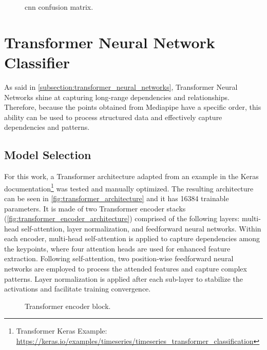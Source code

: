 \begin{figure}[ht]
    \centering
    {\fontsize{10}{12}\selectfont}
    \caption{\acs{cnn} confusion matrix.}
    \label{fig:cnn_dataset2_confusion_matrix}
\end{figure}

\section{Transformer Neural Network Classifier}
\label{section:transformer_classifier}

As said in \autoref{subsection:transformer_neural_networks}, Transformer Neural Networks shine at capturing long-range dependencies and relationships. Therefore, because the points obtained from Mediapipe have a specific order, this ability can be used to process structured data and effectively capture dependencies and patterns.

\subsection{Model Selection}

For this work, a Transformer architecture adapted from an example in the Keras documentation\footnote{Transformer Keras Example: \url{https://keras.io/examples/timeseries/timeseries_transformer_classification}} was tested and manually optimized. The resulting architecture can be seen in \autoref{fig:transformer_architecture} and it has \num{16384} trainable parameters. It is made of two Transformer encoder stacks (\autoref{fig:transformer_encoder_architecture}) comprised of the following layers: multi-head self-attention, layer normalization, and feedforward neural networks. Within each encoder, multi-head self-attention is applied to capture dependencies among the keypoints, where four attention heads are used for enhanced feature extraction. Following self-attention, two position-wise feedforward neural networks are employed to process the attended features and capture complex patterns. Layer normalization is applied after each sub-layer to stabilize the activations and facilitate training convergence. 

\begin{figure}[ht]
    \centering
    {\fontsize{10}{12}\selectfont}
    \caption{Transformer encoder block.}
    \label{fig:transformer_encoder_architecture}
\end{figure}

